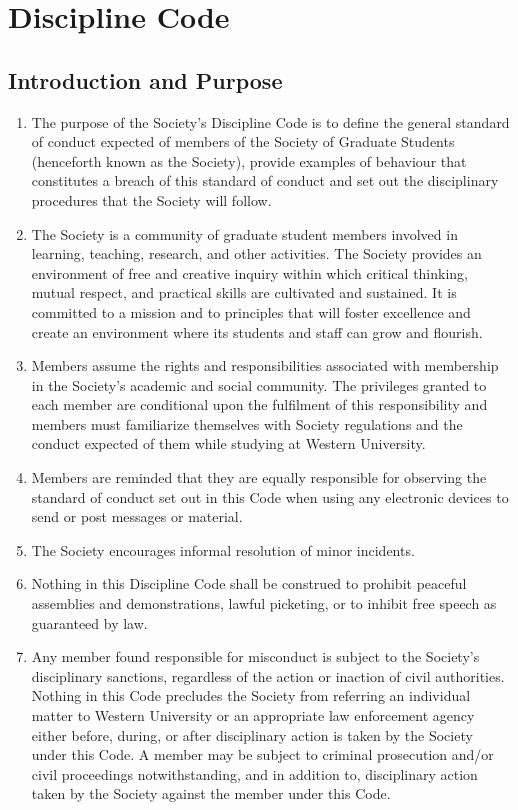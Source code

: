 \section{Discipline Code}\label{policy: code of conduct}

\subsection{Introduction and Purpose}
\begin{enumerate} [align=left]
\item  The purpose of the Society's Discipline Code is to define the general standard of conduct expected of members of the Society of Graduate Students (henceforth known as the Society), provide examples of behaviour that constitutes a breach of this standard of conduct and set out the disciplinary procedures that the Society will follow.
\item The Society is a community of graduate student members involved in learning, teaching, research, and other activities. The Society provides an environment of free and creative inquiry within which critical thinking, mutual respect, and practical skills are cultivated and sustained. It is committed to a mission and to principles that will foster excellence and create an environment where its students and staff can grow and flourish.
\item Members assume the rights and responsibilities associated with membership in the Society's academic and social community. The privileges granted to each member are conditional upon the fulfilment of this responsibility and members must familiarize themselves with Society regulations and the conduct expected of them while studying at Western University.
\item Members are reminded that they are equally responsible for observing the standard of conduct set out in this Code when using any electronic devices to send or post messages or material.
\item The Society encourages informal resolution of minor incidents.
\item Nothing in this Discipline Code shall be construed to prohibit peaceful assemblies and demonstrations, lawful picketing, or to inhibit free speech as guaranteed by law.
\item Any member found responsible for misconduct is subject to the Society's disciplinary sanctions, regardless of the action or inaction of civil authorities. Nothing in this Code precludes the Society from referring an individual matter to Western University or an appropriate law enforcement agency either before, during, or after disciplinary action is taken by the Society under this Code. A member may be subject to criminal prosecution and/or civil proceedings notwithstanding, and in addition to, disciplinary action taken by the Society against the member under this Code.
\end{enumerate}

